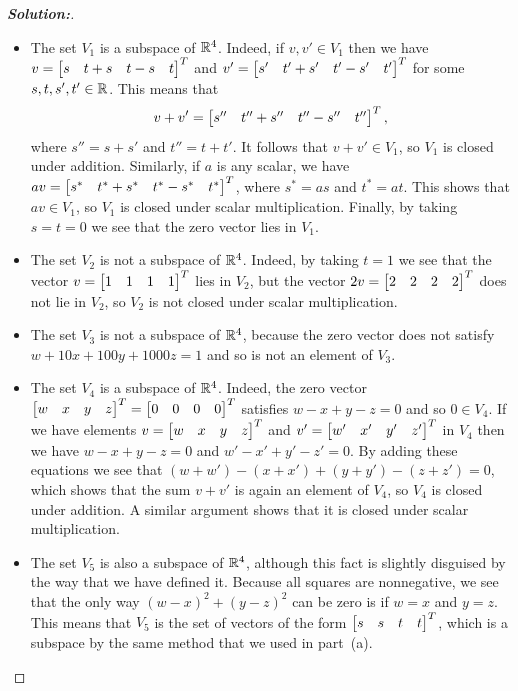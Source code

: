 \documentclass[a4paper]{amsart}
\theoremstyle{definition}
\newenvironment{solution}{\begin{proof}[\textbf{Solution:}] \vphantom{u}}{\end{proof}}
\begin{document}
\begin{solution}
 \begin{itemize}
  \item[(a)] The set $V_1$ is a subspace of ${\mathbb{R}}^4$.  Indeed, if $v,v'\in V_1$
   then we have $v=\left[\begin{matrix} s&t+s&t-s&t\end{matrix}\right]^T$ and $v'=\left[\begin{matrix}
   s'&t'+s'&t'-s'&t'\end{matrix}\right]^T$ for some $s,t,s',t'\in{\mathbb{R}}$.  This means that
   \[
   v+v'=\left[\begin{matrix} s''&t''+s''&t''-s''&t''\end{matrix}\right]^T ,
   \]
   where $s''=s+s'$ and
   $t''=t+t'$.  It follows that $v+v'\in V_1$, so $V_1$ is closed under
   addition.  Similarly, if $a$ is any scalar, we have
   $av=\left[\begin{matrix} s^*&t^*+s^*&t^*-s^*&t^*\end{matrix}\right]^T$, where $s^*=as$ and
   $t^*=at$.  This shows that $av\in V_1$, so $V_1$ is closed under
   scalar multiplication.  Finally, by taking $s=t=0$ we see that the
   zero vector lies in $V_1$.
  \item[(b)] The set $V_2$ is not a subspace of ${\mathbb{R}}^4$.  Indeed, by
   taking $t=1$ we see that the vector $v=\left[\begin{matrix} 1&1&1&1\end{matrix}\right]^T$ lies in
   $V_2$, but the vector $2v=\left[\begin{matrix} 2&2&2&2\end{matrix}\right]^T$ does not lie in
   $V_2$, so $V_2$ is not closed under scalar multiplication.
  \item[(c)] The set $V_3$ is not a subspace of ${\mathbb{R}}^4$, because the
   zero vector does not satisfy $w+10x+100y+1000z=1$ and so is not an
   element of $V_3$.
  \item[(d)] The set $V_4$ is a subspace of ${\mathbb{R}}^4$.  Indeed, the zero
   vector $\left[\begin{matrix} w&x&y&z\end{matrix}\right]^T=\left[\begin{matrix} 0&0&0&0\end{matrix}\right]^T$ satisfies $w-x+y-z=0$
   and so $0\in V_4$.  If we have elements $v=\left[\begin{matrix} w&x&y&z\end{matrix}\right]^T$ and
   $v'=\left[\begin{matrix} w'&x'&y'&z'\end{matrix}\right]^T$ in $V_4$ then we have $w-x+y-z=0$
   and $w'-x'+y'-z'=0$.  By adding these equations we see that
   $(w+w')-(x+x')+(y+y')-(z+z')=0$, which shows that the sum $v+v'$ is
   again an element of $V_4$, so $V_4$ is closed under addition.  A
   similar argument shows that it is closed under scalar
   multiplication.
  \item[(e)] The set $V_5$ is also a subspace of ${\mathbb{R}}^4$, although this
   fact is slightly disguised by the way that we have defined it.
   Because all squares are nonnegative, we see that the only way
   $(w-x)^2+(y-z)^2$ can be zero is if $w=x$ and $y=z$.  This means
   that $V_5$ is the set of vectors of the form $\left[\begin{matrix} s&s&t&t\end{matrix}\right]^T$,
   which is a subspace by the same method that we used in part~(a).
 \end{itemize}
\end{solution}
\end{document}

